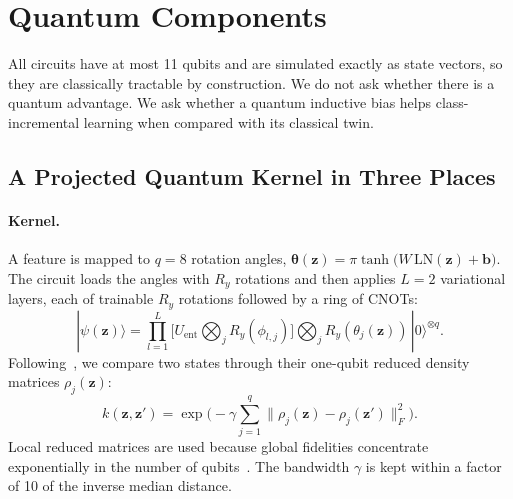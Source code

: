 \section{Quantum Components}
\label{sec:quantum}

All circuits have at most 11 qubits and are simulated exactly as state
vectors, so they are classically tractable by construction. We do not ask
whether there is a quantum advantage. We ask whether a quantum inductive
bias helps class-incremental learning when compared with its classical twin.

\subsection{A Projected Quantum Kernel in Three Places}
\label{sec:pqk}

\paragraph{Kernel.}
A feature is mapped to $q=8$ rotation angles,
$\boldsymbol\theta(\mathbf z)=\pi\tanh\big(W\,\mathrm{LN}(\mathbf z)+\mathbf b\big)$.
The circuit loads the angles with $R_y$ rotations and then applies $L=2$
variational layers, each of trainable $R_y$ rotations followed by a ring of
CNOTs:
\begin{equation}
  |\psi(\mathbf z)\rangle=\prod_{l=1}^{L}\Big[U_{\mathrm{ent}}\textstyle\bigotimes_jR_y(\phi_{l,j})\Big]
  \textstyle\bigotimes_jR_y(\theta_j(\mathbf z))\,|0\rangle^{\otimes q}.
\end{equation}
Following~\cite{huang2021power}, we compare two states through their
one-qubit reduced density matrices $\rho_j(\mathbf z)$:
\begin{equation}
  k(\mathbf z,\mathbf z')=\exp\Big(-\gamma\sum_{j=1}^{q}\big\|\rho_j(\mathbf z)-\rho_j(\mathbf z')\big\|_F^2\Big).
  \label{eq:pqk}
\end{equation}
Local reduced matrices are used because global fidelities concentrate
exponentially in the number of qubits~\cite{thanasilp2024concentration}. The
bandwidth $\gamma$ is kept within a factor of 10 of the inverse median
distance.

